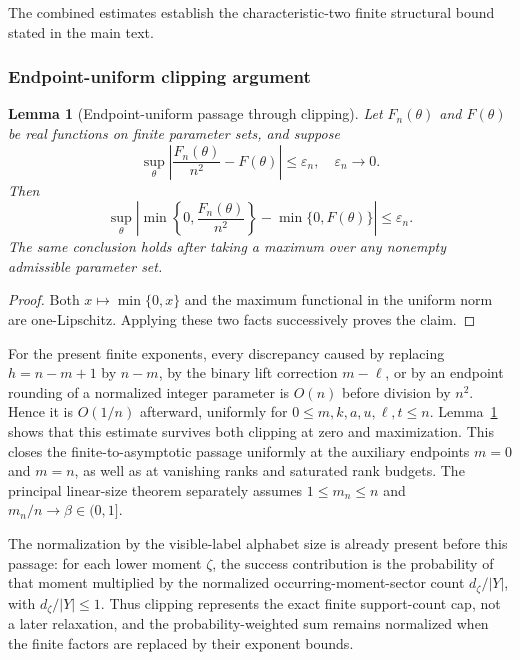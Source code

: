 \documentclass[11pt]{article}
\newcommand{\1}{\mathbf 1}
\theoremstyle{plain}
\newtheorem{lemma}[theorem]{Lemma}
\theoremstyle{definition}
\theoremstyle{remark}
\begin{document}
The combined estimates establish the characteristic-two finite structural bound stated in the main text.

\subsubsection{Endpoint-uniform clipping argument}
\label{subsubsec:binary-endpoint-clipping}

\begin{lemma}[Endpoint-uniform passage through clipping]
\label{lem:endpoint-uniform-clipping-passage}
Let $F_n(\theta)$ and $F(\theta)$ be real functions on finite parameter sets,
and suppose
\begin{equation}
 \sup_\theta\left|\frac{F_n(\theta)}{n^2}-F(\theta)\right|
 \le \varepsilon_n,
 \quad \varepsilon_n\longrightarrow0.
 \label{eq:endpoint-uniform-preclipping-error}
\end{equation}
Then
\begin{equation}
 \sup_\theta\left|
 \min\left\{0,\frac{F_n(\theta)}{n^2}\right\}
 -\min\{0,F(\theta)\}\right|
 \le\varepsilon_n.
 \label{eq:endpoint-uniform-postclipping-error}
\end{equation}
The same conclusion holds after taking a maximum over any nonempty admissible
parameter set.
\end{lemma}
\begin{proof}
Both $x\mapsto\min\{0,x\}$ and the maximum functional in the uniform norm are
one-Lipschitz.  Applying these two facts successively proves the claim.
\end{proof}

For the present finite exponents, every discrepancy caused by replacing
$h=n-m+1$ by $n-m$, by the binary lift correction $m-\ell$, or by an endpoint
rounding of a normalized integer parameter is $O(n)$ before division by
$n^2$.  Hence it is $O(1/n)$ afterward, uniformly for $0\le m,k,a,u,\ell,t\le
n$.  Lemma~\ref{lem:endpoint-uniform-clipping-passage} shows that this estimate
survives both clipping at zero and maximization.  This closes the finite-to-asymptotic passage uniformly at the auxiliary
endpoints $m=0$ and $m=n$, as well as at vanishing ranks and saturated rank
budgets.  The principal linear-size theorem separately assumes
$1\le m_n\le n$ and $m_n/n\to\beta\in(0,1]$.

The normalization by the visible-label alphabet size is already present before
this passage: for each lower moment $\zeta$, the success contribution is the
probability of that moment multiplied by the normalized occurring-moment-sector
count $d_\zeta/|Y|$, with $d_\zeta/|Y|\le1$.  Thus clipping represents the
exact finite support-count cap, not a later relaxation, and the
probability-weighted sum remains normalized
when the finite factors are replaced by their exponent bounds.
\end{document}
